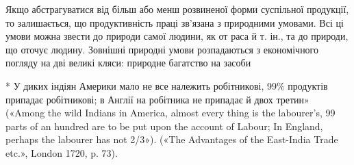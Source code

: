 Якщо абстрагуватися від більш або менш розвиненої форми
суспільної продукції, то залишається, що продуктивність праці
зв’язана з природними умовами. Всі ці умови можна звести до
природи самої людини, як от раса й т. ін., та до природи, що оточує
людину. Зовнішні природні умови розпадаються з економічного
погляду на дві великі кляси: природне багатство на засоби

* У диких індіян Америки мало не все належить робітникові, 99\%
продуктів припадає робітникові; в Англії на робітника не припадає й
двох третин» («Among the wild Indians in America, almost every thing
is the labourer’s, 99 parts of an hundred are to be put upon the account of
Labour; In England, perhaps the labourer has not 2/3»). («The Advantages
of the East-India Trade etc.», London 1720, p. 73).
\parbreak{}  %
